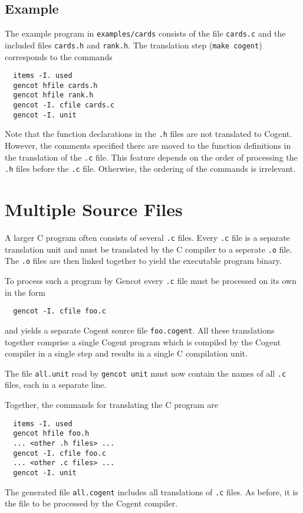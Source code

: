 \documentclass[a4paper]{report}
\newcommand{\code}[1]{\textnormal{\texttt{#1}}}
\begin{document}
\subsection{Example}

The example program in \code{examples/cards} consists of the file \code{cards.c} and the included files \code{cards.h}
and \code{rank.h}. The translation step (\code{make cogent}) corresponds to the commands
\begin{verbatim}
  items -I. used
  gencot hfile cards.h
  gencot hfile rank.h
  gencot -I. cfile cards.c
  gencot -I. unit
\end{verbatim}

Note that the function declarations in the \code{.h} files are not translated to Cogent. However, the comments specified 
there are moved to the function definitions in the translation of the \code{.c} file. This feature depends on the order of
processing the \code{.h} files before the \code{.c} file. Otherwise, the ordering of the commands is irrelevant.

\section{Multiple Source Files}
\label{struct-multi}

A larger C program often consists of several \code{.c} files. Every \code{.c} file is a separate translation unit and
must be translated by the C compiler to a seperate \code{.o} file. The \code{.o} files are then linked together to
yield the executable program binary.

To process such a program by Gencot every \code{.c} file must be processed on its own in the form
\begin{verbatim}
  gencot -I. cfile foo.c
\end{verbatim}
and yields a separate Cogent source file \code{foo.cogent}. All these translations together comprise a single
Cogent program which is compiled by the Cogent compiler in a single step and results in a single C compilation unit.

The file \code{all.unit} read by \code{gencot unit} must now contain the names of all \code{.c} files, each in a 
separate line.

Together, the commands for translating the C program are
\begin{verbatim}
  items -I. used
  gencot hfile foo.h
  ... <other .h files> ...
  gencot -I. cfile foo.c
  ... <other .c files> ...
  gencot -I. unit
\end{verbatim}
The generated file \code{all.cogent} includes all translations of \code{.c} files. As before, it is the 
file to be processed by the Cogent compiler.
\end{document}
